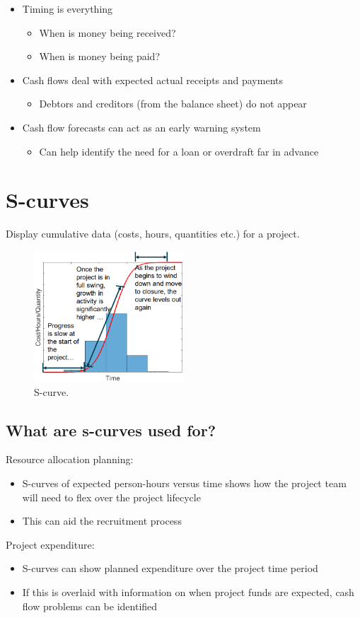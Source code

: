 \begin{itemize}
    \item Timing is everything
          \begin{itemize}
              \item When is money being received?
              \item When is money being paid?
          \end{itemize}
    \item Cash flows deal with expected actual receipts and payments
          \begin{itemize}
              \item Debtors and creditors (from the balance sheet) do not appear
          \end{itemize}
    \item Cash flow forecasts can act as an early warning system
          \begin{itemize}
              \item Can help identify the need for a loan or overdraft far in advance
          \end{itemize}
\end{itemize}
\section{S-curves}
Display cumulative data (costs, hours, quantities etc.) for a project.
\begin{figure}[H]
    \centering
    \includegraphics[width = 0.5\textwidth]{img/figure59.png}
    \caption{S-curve.}
\end{figure}
\subsection{What are s-curves used for?}
Resource allocation planning:
\begin{itemize}
    \item S-curves of expected person-hours versus time shows how the project team will need to flex over the project lifecycle
    \item This can aid the recruitment process
\end{itemize}
Project expenditure:
\begin{itemize}
    \item S-curves can show planned expenditure over the project time period
    \item If this is overlaid with information on when project funds are expected, cash flow problems can be identified
\end{itemize}
